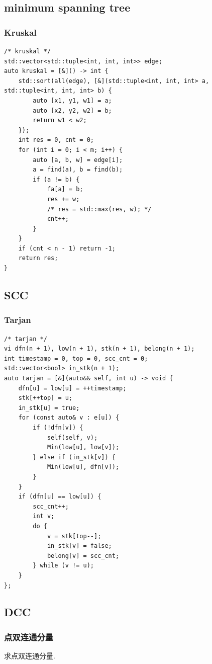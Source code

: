 \documentclass[UTF8, a4paper, titlepage, twoside]{ctexart}
\begin{document}
\subsection{ minimum spanning tree }
\subsubsection*{ Kruskal }
\begin{lstlisting}[style=cpp]
/* kruskal */
std::vector<std::tuple<int, int, int>> edge;
auto kruskal = [&]() -> int {
    std::sort(all(edge), [&](std::tuple<int, int, int> a, std::tuple<int, int, int> b) {
        auto [x1, y1, w1] = a;
        auto [x2, y2, w2] = b;
        return w1 < w2;
    });
    int res = 0, cnt = 0;
    for (int i = 0; i < m; i++) {
        auto [a, b, w] = edge[i];
        a = find(a), b = find(b);
        if (a != b) {
            fa[a] = b;
            res += w;
            /* res = std::max(res, w); */
            cnt++;
        }
    }
    if (cnt < n - 1) return -1;
    return res;
}
\end{lstlisting}

\subsection{ SCC }
\subsubsection*{ Tarjan }
\begin{lstlisting}[style=cpp]
/* tarjan */
vi dfn(n + 1), low(n + 1), stk(n + 1), belong(n + 1);
int timestamp = 0, top = 0, scc_cnt = 0;
std::vector<bool> in_stk(n + 1);
auto tarjan = [&](auto&& self, int u) -> void {
    dfn[u] = low[u] = ++timestamp;
    stk[++top] = u;
    in_stk[u] = true;
    for (const auto& v : e[u]) {
        if (!dfn[v]) {
            self(self, v);
            Min(low[u], low[v]);
        } else if (in_stk[v]) {
            Min(low[u], dfn[v]);
        }
    }
    if (dfn[u] == low[u]) {
        scc_cnt++;
        int v;
        do {
            v = stk[top--];
            in_stk[v] = false;
            belong[v] = scc_cnt;
        } while (v != u);
    }
};
\end{lstlisting}

\subsection{ DCC }
\subsubsection*{ 点双连通分量 }
求点双连通分量.
\end{document}
